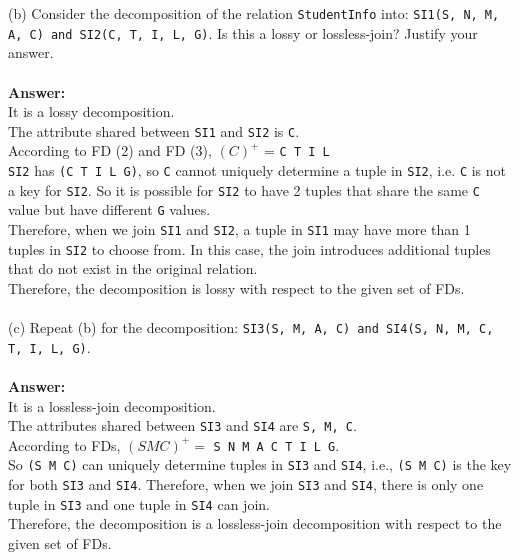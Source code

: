\documentclass{article}
\begin{document}
\noindent (b) Consider the decomposition of the relation \texttt{StudentInfo} into: \texttt{SI1(S, N, M, A, C) and SI2(C, T, I, L, G)}. Is this a lossy or lossless-join? Justify your answer.\\
\\
\textbf{Answer:}\\
It is a lossy decomposition.\\
The attribute shared between \texttt{SI1} and \texttt{SI2} is \texttt{C}. \\
According to FD (2) and FD (3), \((C)^{+}\) = \texttt{C T I L} \\
\texttt{SI2} has \texttt{(C T I L G)}, so \texttt{C} cannot uniquely determine a tuple in \texttt{SI2}, i.e. \texttt{C} is not a key for \texttt{SI2}. So it is possible for \texttt{SI2} to have 2 tuples that share the same \texttt{C} value but have different \texttt{G} values.\\
Therefore, when we join \texttt{SI1} and \texttt{SI2}, a tuple in \texttt{SI1} may have more than 1 tuples in \texttt{SI2} to choose from. In this case, the join introduces additional tuples that do not exist in the original relation.\\
Therefore, the decomposition is lossy with respect to the given set of FDs.\\
\\
\noindent (c) Repeat (b) for the decomposition: \texttt{SI3(S, M, A, C) and SI4(S, N, M, C, T, I, L, G)}. \\
\\
\textbf{Answer:}\\
It is a lossless-join decomposition.\\
The attributes shared between \texttt{SI3} and \texttt{SI4} are \texttt{S, M, C}.\\
According to FDs, \( (S M C)^+ = \) \texttt{S N M A C T I L G}. \\
So \texttt{(S M C)} can uniquely determine tuples in \texttt{SI3} and \texttt{SI4}, i.e., \texttt{(S M C)} is the key for both \texttt{SI3} and \texttt{SI4}. Therefore, when we join \texttt{SI3} and \texttt{SI4}, there is only one tuple in \texttt{SI3} and one tuple in \texttt{SI4} can join. \\
Therefore, the decomposition is a lossless-join decomposition with respect to the given set of FDs.
\end{document}
